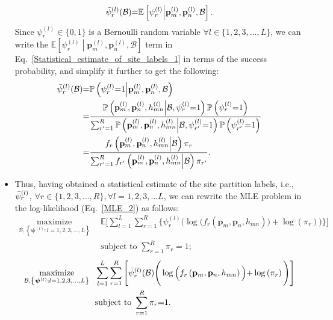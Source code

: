 \documentclass{article}
\begin{document}
\begin{itemize}
    \begin{align}\label{Statistical_estimate_of_site_labels_1}
        \Bar{\psi}_{r}^{(l)}(\mathcal{B}){=}\mathbb{E}\left[\psi_{r}^{(l)}\middle|\mathbf{p}_{m}^{(l)},\mathbf{p}_{n}^{(l)},\mathcal{B}\right].
    \end{align}
    Since $\psi_{r}^{(l)}{\in}\{0,1\}$ is a Bernoulli random variable ${\forall}l{\in}\{1,2,3,{\dots},L\}$, we can write the $\mathbb{E}\left[\psi_{r}^{(l)}\middle|\mathbf{p}_{m}^{(l)},\mathbf{p}_{n}^{(l)},\mathcal{B}\right]$ term in Eq.~\eqref{Statistical_estimate_of_site_labels_1} in terms of the success probability, and simplify it further to get the following:
    \begin{align}\label{Statistical_estimate_of_site_labels_2}
        \Bar{\psi}_{r}^{(l)}(\mathcal{B}){=}&\mathbb{P}\left(\psi_{r}^{(l)}{=}1\middle|\mathbf{p}_{m}^{(l)},\mathbf{p}_{n}^{(l)},\mathcal{B}\right)\nonumber\\{=}&\frac{\mathbb{P}\left(\mathbf{p}_{m}^{(l)},\mathbf{p}_{n}^{(l)},h_{mn}^{(l)}\middle|\mathcal{B},\psi_{r}^{(l)}{=}1\right)\mathbb{P}\left(\psi_{r}^{(l)}{=}1\right)}{\sum_{r'{=}1}^{R}\mathbb{P}\left(\mathbf{p}_{m}^{(l)},\mathbf{p}_{n}^{(l)},h_{mn}^{(l)}\middle|\mathcal{B},\psi_{r'}^{(l)}{=}1\right)\mathbb{P}\left(\psi_{r'}^{(l)}{=}1\right)}\nonumber\\{=}&\frac{f_{r}\left(\mathbf{p}_{m}^{(l)},\mathbf{p}_{n}^{(l)},h_{mn}^{(l)}\middle|\mathcal{B}\right)\pi_{r}}{\sum_{r'{=}1}^{R}f_{r'}\left(\mathbf{p}_{m}^{(l)},\mathbf{p}_{n}^{(l)},h_{mn}^{(l)}\middle|\mathcal{B}\right)\pi_{r'}}.
    \end{align}
    \item Thus, having obtained a statistical estimate of the site partition labels, i.e., $\Bar{\psi}_{r}^{(l)}$, ${\forall}r{\in}\{1,2,3,{\dots},R\},{\forall}l{=}1,2,3,{\dots}L$, we can rewrite the MLE problem in the log-likelihood (Eq.~\eqref{MLE_2}) as follows:
    \begin{align}\label{MLE_3}
        \underset{{\mathcal{B},\left\{\boldsymbol{\psi}^{(l)}:l{=}1,2,3,{\dots},L\right\}}}{\mathrm{maximize}}\ \ &\mathbb{E}\Bigg[\sum_{l{=}1}^{L}\sum_{r{=}1}^{R}\Bigg\{\psi_{r}^{(l)}\Bigg(\log\Big(f_{r}\left(\mathbf{p}_{m},\mathbf{p}_{n},h_{mn}\right)\Big){+}\log\left(\pi_{r}\right)\Bigg)\Bigg\}\Bigg]\nonumber\\&\text{subject to }\sum_{r{=}1}^{R}\pi_{r}{=}1;
    \end{align}
    \begin{align}\label{MLE_4}
        \underset{{\mathcal{B},\left\{\boldsymbol{\psi}^{(l)}:l{=}1,2,3,{\dots},L\right\}}}{\mathrm{maximize}}\ \ &\sum_{l{=}1}^{L}\sum_{r{=}1}^{R}\Bigg[\Bar{\psi}_{r}^{(l)}(\mathcal{B})\Bigg(\log\Big(f_{r}\left(\mathbf{p}_{m},\mathbf{p}_{n},h_{mn}\right)\Big){+}\log\left(\pi_{r}\right)\Bigg)\Bigg]\nonumber\\&\text{subject to }\sum_{r{=}1}^{R}\pi_{r}{=}1.

\end{align}
\end{itemize}
\end{document}
